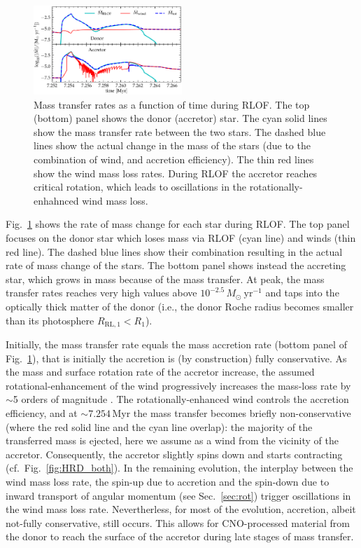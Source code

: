 \documentclass[twocolumn,twocolappendix,trackchanges]{aastex63}
\DeclareRobustCommand{\Figref}[1]{Fig.~\ref{#1}}
\DeclareRobustCommand{\Secref}[1]{Sec.~\ref{#1}}
\begin{document}
\begin{figure}[htbp]
  \includegraphics[width=0.5\textwidth]{MT}
  \caption{Mass transfer rates as a function of time during RLOF. The top (bottom) panel
    shows the donor (accretor) star. The cyan solid lines show the
    mass transfer rate between the two stars. The dashed blue lines
    show the actual change in the mass of the stars (due to the
    combination of wind, and accretion efficiency). The thin red
    lines show the wind mass loss rates. During RLOF the accretor
    reaches critical rotation, which leads to oscillations in the
    rotationally-enhahnced wind mass loss.}
  \label{fig:MT}
\end{figure}

\Figref{fig:MT} shows the rate of mass change for each star during
RLOF. The top panel focuses on the donor star which loses mass via RLOF
(cyan line) and winds (thin red line). The dashed blue lines
show their combination resulting in the actual rate of mass change of
the stars. The bottom panel shows instead the accreting star, which
grows in mass because of the mass transfer. At peak, the mass transfer
rates reaches very high values above
$10^{-2.5}\,M_\odot\ \mathrm{yr^{-1}}$ and taps into the optically
thick matter of the donor (i.e., the donor Roche radius becomes
smaller than its photosphere $R_\mathrm{RL,1}<R_1$).


Initially, the mass transfer rate equals the mass accretion rate
(bottom panel of \Figref{fig:MT}), that is initially the accretion is
(by construction) fully conservative. As the mass and surface rotation
rate of the accretor increase, the assumed rotational-enhancement of
the wind progressively increases the mass-loss rate by $\sim$5 orders
of magnitude \citep{langer:98}. The rotationally-enhanced wind
controls the accretion efficiency, and at
$\sim$$7.254$\,Myr the mass transfer becomes briefly non-conservative (where the red solid line and the cyan line overlap): the majority of the transferred mass is ejected, here we assume as a wind from the vicinity of the accretor. Consequently, the accretor slightly spins down and starts contracting (cf.~\Figref{fig:HRD_both}). In the remaining evolution, the interplay between the wind mass loss rate, the spin-up due to accretion and the spin-down due to inward transport of angular momentum (see \Secref{sec:rot}) trigger oscillations in the wind mass loss rate. Nevertherless, for most of the evolution, accretion, albeit not-fully conservative, still occurs. This allows for CNO-processed material from the donor to reach the surface of the accretor during late stages of mass transfer.
\end{document}
